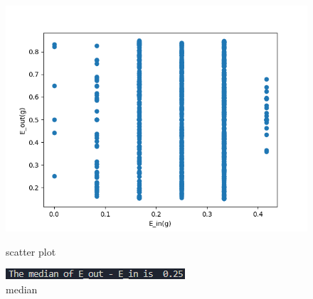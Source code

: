 \documentclass[12pt,a4paper]{article}
\begin{document}
\begin{figure}[hbp]
    \centering
    \begin{minipage}{0.48\linewidth}
        \centering
        \includegraphics[width = \linewidth]{Hw2P11.png}
        \caption{scatter plot}
    \end{minipage}\hfil
    \begin{minipage}{0.48\linewidth}
        \centering
        \includegraphics[width = \linewidth]{Hw2P11 median.png}
        \caption{median}
    \end{minipage}\hfil
    \centering

\end{figure}
\end{document}
